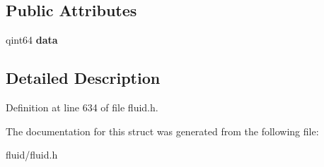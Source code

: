 \subsection*{Public Attributes}
\begin{DoxyCompactItemize}
\item 
\mbox{\label{struct_fluid_s_1_1_phase_ab4fdcc9f5df937dc3cd2a788e8d8444a}} 
qint64 {\bfseries data}
\end{DoxyCompactItemize}


\subsection{Detailed Description}


Definition at line 634 of file fluid.\+h.



The documentation for this struct was generated from the following file\+:\begin{DoxyCompactItemize}
\item 
fluid/fluid.\+h\end{DoxyCompactItemize}
